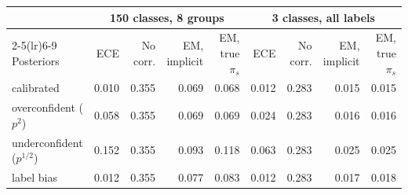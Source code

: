 \begin{tabular}{lrrrrrrrr}
\toprule
 & \multicolumn{4}{c}{150 classes, 8 groups} & \multicolumn{4}{c}{3 classes, all labels} \\
\cmidrule(lr){2-5}\cmidrule(lr){6-9}
Posteriors & ECE & No corr. & EM, implicit & EM, true $\pi_s$ & ECE & No corr. & EM, implicit & EM, true $\pi_s$ \\
\midrule
calibrated & 0.010 & 0.355 & 0.069 & 0.068 & 0.012 & 0.283 & 0.015 & 0.015 \\
overconfident ($p^2$) & 0.058 & 0.355 & 0.069 & 0.069 & 0.024 & 0.283 & 0.016 & 0.016 \\
underconfident ($p^{1/2}$) & 0.152 & 0.355 & 0.093 & 0.118 & 0.063 & 0.283 & 0.025 & 0.025 \\
label bias & 0.012 & 0.355 & 0.077 & 0.083 & 0.012 & 0.283 & 0.017 & 0.018 \\
\bottomrule
\end{tabular}
